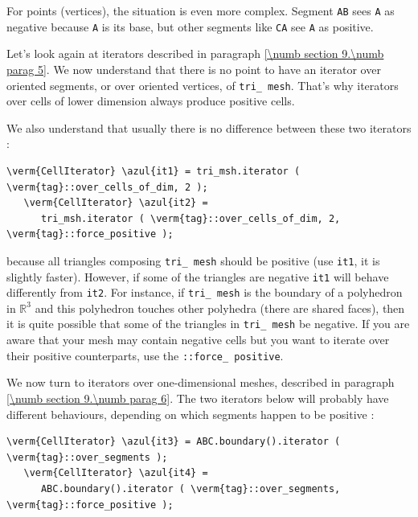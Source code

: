 For points (vertices), the situation is even more complex.
Segment {\small\tt AB} sees {\small\tt A} as negative because {\small\tt A} is its base,
but other segments like {\small\tt CA} see {\small\tt A} as positive.

Let's look again at iterators described in paragraph \ref{\numb section 9.\numb parag 5}.
We now understand that there is no point to have an iterator over oriented
segments, or over oriented vertices, of {\small\tt tri\_\,mesh}.
That's why iterators over cells of lower dimension always produce positive cells.

We also understand that usually there is no difference between these two iterators :

\begin{Verbatim}[commandchars=\\\{\},formatcom=\small\tt,
   baselinestretch=0.94,framesep=2mm                      ]
   \verm{CellIterator} \azul{it1} = tri_msh.iterator ( \verm{tag}::over_cells_of_dim, 2 );
   \verm{CellIterator} \azul{it2} =
      tri_msh.iterator ( \verm{tag}::over_cells_of_dim, 2, \verm{tag}::force_positive );
\end{Verbatim}

\noindent because all triangles composing {\small\tt tri\_\,mesh} should be positive
(use {\small\tt it1}, it is slightly faster).
However, if some of the triangles are negative {\small\tt it1} will behave differently from
{\small\tt it2}.
For instance, if {\small\tt tri\_\,mesh} is the boundary of a polyhedron in $ \mathbb{R}^3 $
and this polyhedron touches other polyhedra (there are shared faces), then it is
quite possible that some of the triangles in {\small\tt tri\_\,mesh} be negative.
If you are aware that your mesh may contain negative cells but
you want to iterate over their positive counterparts, use the {\small\tt {}::force\_\,positive}.

We now turn to iterators over one-dimensional meshes, described in paragraph
\ref{\numb section 9.\numb parag 6}.
The two iterators below will probably have different behaviours,
depending on which segments happen to be positive :

\begin{Verbatim}[commandchars=\\\{\},formatcom=\small\tt,
   baselinestretch=0.94,framesep=2mm                      ]
   \verm{CellIterator} \azul{it3} = ABC.boundary().iterator ( \verm{tag}::over_segments );
   \verm{CellIterator} \azul{it4} =
      ABC.boundary().iterator ( \verm{tag}::over_segments, \verm{tag}::force_positive );
\end{Verbatim}

